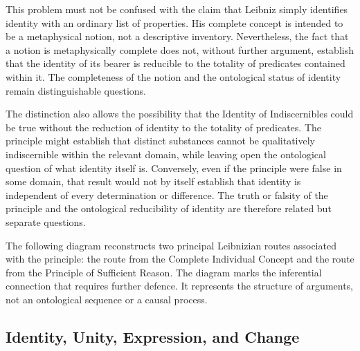 \label{para:VS.B01.P01.C08.S07.SS09.P004}

This problem must not be confused with the
claim that Leibniz simply identifies identity
with an ordinary list of properties.
His complete concept is intended to be
a metaphysical notion, not a descriptive
inventory. Nevertheless, the fact that
a notion is metaphysically complete does
not, without further argument, establish
that the identity of its bearer is reducible
to the totality of predicates contained
within it. The completeness of the notion
and the ontological status of identity
remain distinguishable questions.

\label{para:VS.B01.P01.C08.S07.SS09.P005}

The distinction also allows the possibility
that the Identity of Indiscernibles could
be true without the reduction of identity
to the totality of predicates. The principle
might establish that distinct substances
cannot be qualitatively indiscernible
within the relevant domain, while leaving
open the ontological question of what
identity itself is. Conversely, even if
the principle were false in some domain,
that result would not by itself establish
that identity is independent of every
determination or difference. The truth
or falsity of the principle and the
ontological reducibility of identity
are therefore related but separate
questions.

\label{para:VS.B01.P01.C08.S07.SS09.P006}

The following diagram reconstructs two principal
Leibnizian routes associated with the principle:
the route from the Complete Individual Concept
and the route from the Principle of Sufficient
Reason. The diagram marks the inferential
connection that requires further defence.
It represents the structure of arguments,
not an ontological sequence or a causal
process.





\subsection{Identity, Unity, Expression, and Change}
\label{subsec:ch08-leibniz-reciprocal-comparison}

